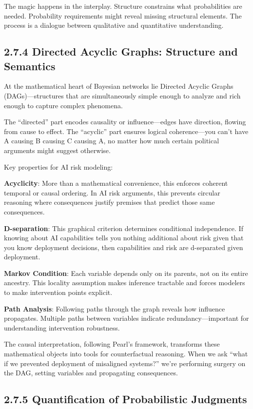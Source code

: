 \documentclass[
  11pt,
  letterpaper,
  openany]{book}
\begin{document}
The magic happens in the interplay. Structure constrains what
probabilities are needed. Probability requirements might reveal missing
structural elements. The process is a dialogue between qualitative and
quantitative understanding.

\subsection{2.7.4 Directed Acyclic Graphs: Structure and
Semantics}\label{sec-dag-structure}

At the mathematical heart of Bayesian networks lie Directed Acyclic
Graphs (DAGs)---structures that are simultaneously simple enough to
analyze and rich enough to capture complex phenomena.

The ``directed'' part encodes causality or influence---edges have
direction, flowing from cause to effect. The ``acyclic'' part ensures
logical coherence---you can't have A causing B causing C causing A, no
matter how much certain political arguments might suggest otherwise.

Key properties for AI risk modeling:

\textbf{Acyclicity}: More than a mathematical convenience, this enforces
coherent temporal or causal ordering. In AI risk arguments, this
prevents circular reasoning where consequences justify premises that
predict those same consequences.

\textbf{D-separation}: This graphical criterion determines conditional
independence. If knowing about AI capabilities tells you nothing
additional about risk given that you know deployment decisions, then
capabilities and risk are d-separated given deployment.

\textbf{Markov Condition}: Each variable depends only on its parents,
not on its entire ancestry. This locality assumption makes inference
tractable and forces modelers to make intervention points explicit.

\textbf{Path Analysis}: Following paths through the graph reveals how
influence propagates. Multiple paths between variables indicate
redundancy---important for understanding intervention robustness.

The causal interpretation, following Pearl's framework, transforms these
mathematical objects into tools for counterfactual reasoning. When we
ask ``what if we prevented deployment of misaligned systems?'' we're
performing surgery on the DAG, setting variables and propagating
consequences.

\subsection{2.7.5 Quantification of Probabilistic
Judgments}\label{sec-quantification}
\end{document}
